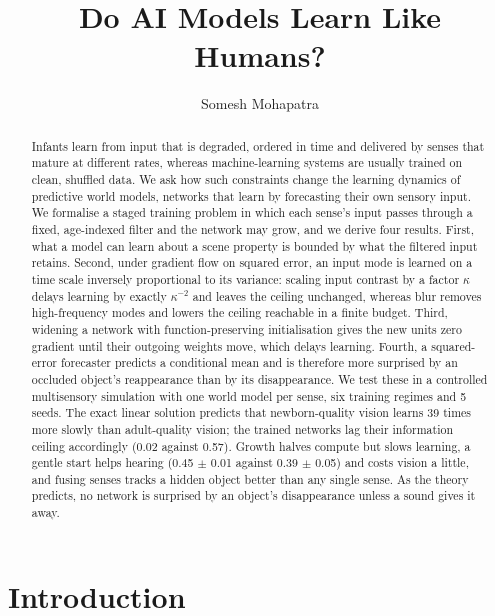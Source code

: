 \documentclass{article}
\title{Do AI Models Learn Like Humans?}
\author[1*]{Somesh Mohapatra}
\affil[1]{Independent.}
\affil[*]{Address correspondence to: pikulsomesh@gmail.com}
\date{}
\begin{document}
\maketitle

\begin{abstract}
Infants learn from input that is degraded, ordered in time and delivered by senses that mature at different rates, whereas machine-learning systems are usually trained on clean, shuffled data. We ask how such constraints change the learning dynamics of predictive world models, networks that learn by forecasting their own sensory input. We formalise a staged training problem in which each sense's input passes through a fixed, age-indexed filter and the network may grow, and we derive four results. First, what a model can learn about a scene property is bounded by what the filtered input retains. Second, under gradient flow on squared error, an input mode is learned on a time scale inversely proportional to its variance: scaling input contrast by a factor \(\kappa\) delays learning by exactly \(\kappa^{-2}\) and leaves the ceiling unchanged, whereas blur removes high-frequency modes and lowers the ceiling reachable in a finite budget. Third, widening a network with function-preserving initialisation gives the new units zero gradient until their outgoing weights move, which delays learning. Fourth, a squared-error forecaster predicts a conditional mean and is therefore more surprised by an occluded object's reappearance than by its disappearance. We test these in a controlled multisensory simulation with one world model per sense, six training regimes and 5 seeds. The exact linear solution predicts that newborn-quality vision learns 39 times more slowly than adult-quality vision; the trained networks lag their information ceiling accordingly (0.02 against 0.57). Growth halves compute but slows learning, a gentle start helps hearing (0.45 \ensuremath{\pm} 0.01 against 0.39 \ensuremath{\pm} 0.05) and costs vision a little, and fusing senses tracks a hidden object better than any single sense. As the theory predicts, no network is surprised by an object's disappearance unless a sound gives it away.
\end{abstract}

\section{Introduction}
\end{document}
